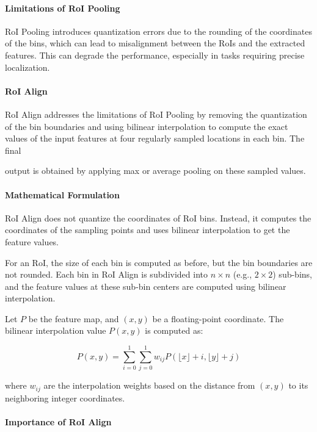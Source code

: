 \documentclass[12pt]{article}
\begin{document}
\paragraph{Limitations of RoI Pooling}

RoI Pooling introduces quantization errors due to the rounding of the coordinates of the bins, which can lead to misalignment between the RoIs and the extracted features. This can degrade the performance, especially in tasks requiring precise localization.

\paragraph{RoI Align}

RoI Align addresses the limitations of RoI Pooling by removing the quantization of the bin boundaries and using bilinear interpolation to compute the exact values of the input features at four regularly sampled locations in each bin. The final

 output is obtained by applying max or average pooling on these sampled values.

\paragraph{Mathematical Formulation}

RoI Align does not quantize the coordinates of RoI bins. Instead, it computes the coordinates of the sampling points and uses bilinear interpolation to get the feature values.

For an RoI, the size of each bin is computed as before, but the bin boundaries are not rounded. Each bin in RoI Align is subdivided into \( n \times n \) (e.g., \( 2 \times 2 \)) sub-bins, and the feature values at these sub-bin centers are computed using bilinear interpolation.

Let \( P \) be the feature map, and \((x, y)\) be a floating-point coordinate. The bilinear interpolation value \( P(x, y) \) is computed as:

\[
P(x, y) = \sum_{i=0}^{1} \sum_{j=0}^{1} w_{ij} P(\lfloor x \rfloor + i, \lfloor y \rfloor + j)
\]

where \( w_{ij} \) are the interpolation weights based on the distance from \((x, y)\) to its neighboring integer coordinates.

\paragraph{Importance of RoI Align}
\end{document}

